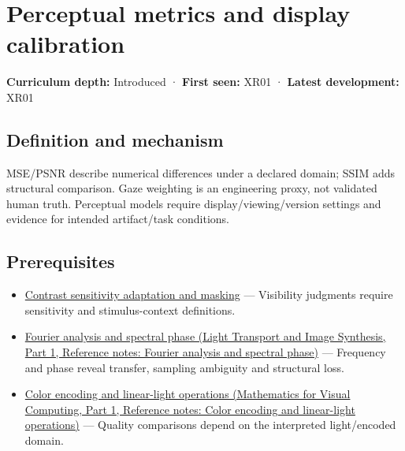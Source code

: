 \hypertarget{appendix-b2c1846508bf}{}\label{referencestart:appendix-b2c1846508bf}
\section{Perceptual metrics and display calibration}\label{appendix-b2c1846508bf-perceptual-metrics-and-display-calibration}

\hypertarget{appendix-b2c1846508bf-perceptual-metrics-and-display-calibration}{}

\textbf{Curriculum depth:} Introduced · \textbf{First seen:} XR01 · \textbf{Latest development:} XR01

\begin{allmightroledefinition}

\subsection{Definition and mechanism}\label{appendix-b2c1846508bf-definition-and-mechanism}

\hypertarget{appendix-b2c1846508bf-definition-and-mechanism}{}

MSE/PSNR describe numerical differences under a declared domain; SSIM adds structural comparison. Gaze weighting is an engineering proxy, not validated human truth. Perceptual models require display/viewing/version settings and evidence for intended artifact/task conditions.

\end{allmightroledefinition}

\subsection{Prerequisites}\label{appendix-b2c1846508bf-prerequisites}

\hypertarget{appendix-b2c1846508bf-prerequisites}{}

\begin{itemize}
\tightlist
\item
  \hyperref[appendix-b3aa9e8e01ad]{Contrast sensitivity adaptation and masking} --- Visibility judgments require sensitivity and stimulus-context definitions.
\item
  \href{../04-Light-Transport-and-Image-Synthesis-P01/main.pdf\#nameddest=appendix-b60686ba06a1}{Fourier analysis and spectral phase (Light Transport and Image Synthesis, Part 1, Reference notes: Fourier analysis and spectral phase)} --- Frequency and phase reveal transfer, sampling ambiguity and structural loss.
\item
  \href{../02-Mathematics-for-Visual-Computing-P01/main.pdf\#nameddest=appendix-a9f83ad40792}{Color encoding and linear-light operations (Mathematics for Visual Computing, Part 1, Reference notes: Color encoding and linear-light operations)} --- Quality comparisons depend on the interpreted light/encoded domain.
\end{itemize}

